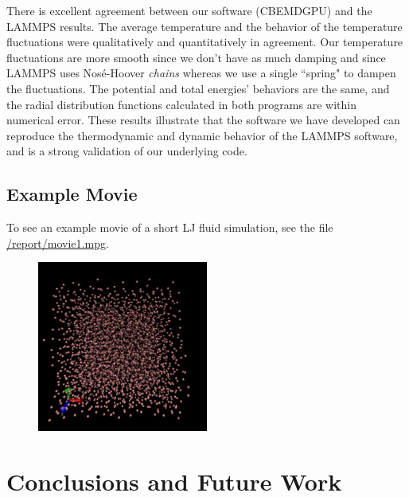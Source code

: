 \documentclass[12pt]{article}
\begin{document}
There is excellent agreement between our software (CBEMDGPU) and the LAMMPS results. The average temperature and the behavior of the temperature fluctuations were qualitatively and quantitatively in agreement. Our temperature fluctuations are more smooth since we don't have as much damping and since LAMMPS uses Nos\'{e}-Hoover \emph{chains} whereas we use a single ``spring" to dampen the fluctuations. The potential and total energies' behaviors are the same, and the radial distribution functions calculated in both programs are within numerical error. These results illustrate that the software we have developed can reproduce the thermodynamic and dynamic behavior of the LAMMPS software, and is a strong validation of our underlying code.

\subsection{Example Movie}
To see an example movie of a short LJ fluid simulation, see the file \url{/report/movie1.mpg}.
\begin{figure}[H]
	\begin{center}
    	\includegraphics[width=0.5\textwidth]{vmd_image.png}
	\end{center}
\end{figure}
\section{Conclusions and Future Work}
\end{document}
